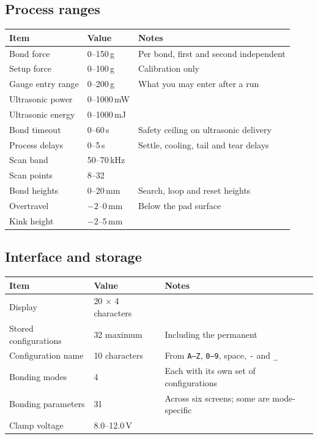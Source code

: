 \subsection*{Process ranges}

\begin{center}\small
\begin{tabular}{@{}L{34mm}L{30mm}L{55mm}@{}}
\toprule
\textbf{Item} & \textbf{Value} & \textbf{Notes} \\
\midrule
Bond force          & 0--150\,g       & Per bond, first and second independent \\
Setup force         & 0--100\,g       & Calibration only \\
Gauge entry range   & 0--200\,g       & What you may enter after a  run \\
Ultrasonic power    & 0--1000\,mW     & \\
Ultrasonic energy   & 0--1000\,mJ     & \\
Bond timeout        & 0--60\,s        & Safety ceiling on ultrasonic delivery \\
Process delays      & 0--5\,s         & Settle, cooling, tail and tear delays \\
Scan band           & 50--70\,kHz     & \\
Scan points         & 8--32           & \\
Bond heights        & 0--20\,mm       & Search, loop and reset heights \\
Overtravel          & $-2$--0\,mm     & Below the pad surface \\
Kink height         & $-2$--5\,mm     & \\
\bottomrule
\end{tabular}
\end{center}

\subsection*{Interface and storage}

\begin{center}\small
\begin{tabular}{@{}L{34mm}L{30mm}L{55mm}@{}}
\toprule
\textbf{Item} & \textbf{Value} & \textbf{Notes} \\
\midrule
Display             & 20 $\times$ 4 characters & \\
Stored configurations & 32 maximum   & Including the permanent  \\
Configuration name  & 10 characters  & From \texttt{A--Z}, \texttt{0--9},
                                       space, \texttt{-} and \texttt{\_} \\
Bonding modes       & 4              & Each with its own set of configurations \\
Bonding parameters  & 31             & Across six screens; some are mode-specific \\
Clamp voltage       & 8.0--12.0\,V   & \\
\bottomrule
\end{tabular}
\end{center}


